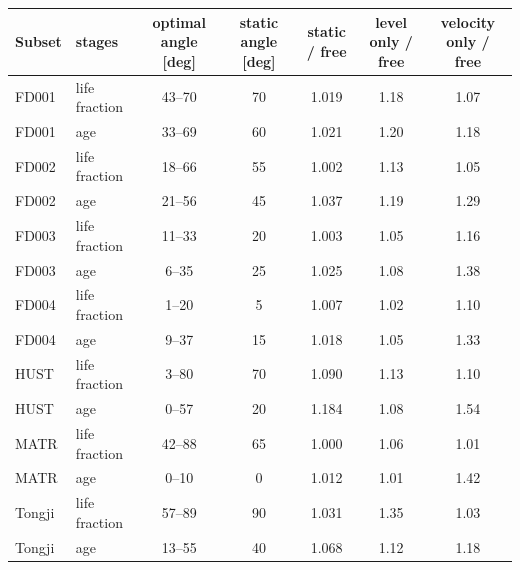 \begin{tabular}{l l c c c c c}
\hline
Subset & stages & optimal angle [deg] & static angle [deg] & static / free & level only / free & velocity only / free \\
\hline
FD001 & life fraction & 43--70 & 70 & 1.019 & 1.18 & 1.07 \\
FD001 & age & 33--69 & 60 & 1.021 & 1.20 & 1.18 \\
FD002 & life fraction & 18--66 & 55 & 1.002 & 1.13 & 1.05 \\
FD002 & age & 21--56 & 45 & 1.037 & 1.19 & 1.29 \\
FD003 & life fraction & 11--33 & 20 & 1.003 & 1.05 & 1.16 \\
FD003 & age & 6--35 & 25 & 1.025 & 1.08 & 1.38 \\
FD004 & life fraction & 1--20 & 5 & 1.007 & 1.02 & 1.10 \\
FD004 & age & 9--37 & 15 & 1.018 & 1.05 & 1.33 \\
HUST & life fraction & 3--80 & 70 & 1.090 & 1.13 & 1.10 \\
HUST & age & 0--57 & 20 & 1.184 & 1.08 & 1.54 \\
MATR & life fraction & 42--88 & 65 & 1.000 & 1.06 & 1.01 \\
MATR & age & 0--10 & 0 & 1.012 & 1.01 & 1.42 \\
Tongji & life fraction & 57--89 & 90 & 1.031 & 1.35 & 1.03 \\
Tongji & age & 13--55 & 40 & 1.068 & 1.12 & 1.18 \\
\hline
\end{tabular}
